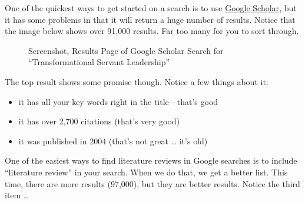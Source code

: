 \documentclass[
  letterpaper,
  DIV=11,
  numbers=noendperiod]{scrreprt}
\providecommand{\tightlist}{%
  \setlength{\itemsep}{0pt}\setlength{\parskip}{0pt}}\usepackage{longtable,booktabs,array}
\begin{document}
One of the quickest ways to get started on a search is to use
\href{scholar.google.com}{Google Scholar}, but it has some problems in
that it will return a huge number of results. Notice that the image
below shows over 91,000 results. Far too many for you to sort through.

\begin{figure}

\caption{\label{fig-googlexsearch2}Screenshot, Results Page of Google
Scholar Search for ``Transformational Servant Leadership''}


\end{figure}%

The top result shows some promise though. Notice a few things about it:

\begin{itemize}
\tightlist
\item
  it has all your key words right in the title---that's good
\item
  it has over 2,700 citations (that's very good)
\item
  it was published in 2004 (that's not great \ldots{} it's old)
\end{itemize}

One of the easiest ways to find literature reviews in Google searches is
to include ``literature review'' in your search. When we do that, we get
a better list. This time, there are more results (97,000), but they are
better results. Notice the third item \ldots{}
\end{document}
